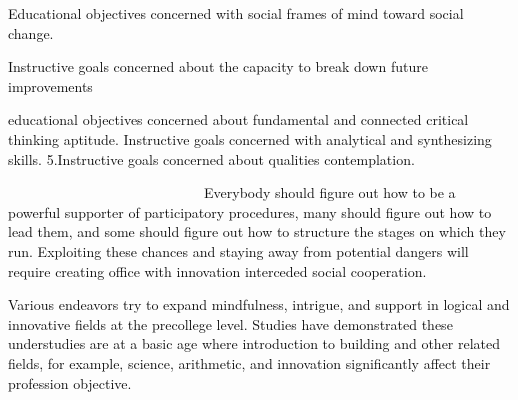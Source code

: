 \documentclass[12pt]{report}
\renewcommand{\_}{\kern-1.5pt\textunderscore\kern-1.5pt}
\begin{document}
\vspace{\baselineskip}
	\item \textcolor[HTML]{0D0D0D}{Educational objectives concerned with social frames of mind toward social  change.}\par


\vspace{\baselineskip}
	\item \textcolor[HTML]{0D0D0D}{Instructive goals concerned about the capacity to break down future improvements}\par


\vspace{\baselineskip}
	\item \textcolor[HTML]{0D0D0D}{educational objectives concerned about fundamental and connected critical thinking aptitude. Instructive goals concerned with analytical and synthesizing skills. 5.Instructive goals concerned about qualities contemplation. }\par


\vspace{\baselineskip}

\vspace{\baselineskip}
\begin{adjustwidth}{0.1in}{0.84in}
\textcolor[HTML]{0D0D0D}{\ \ \ \ \ \ \ \ \ \ \ \ \ \ \ \ \ \ \ \ \ \ \ \ \ \ \ \  Everybody should figure out how to be a powerful supporter of participatory procedures, many should figure out how to lead them, and some should figure out how to structure the stages on which they run. Exploiting these chances and staying away from potential dangers will require creating office with innovation interceded social cooperation.}\par

\end{adjustwidth}


\vspace{\baselineskip}
\vspace{\baselineskip}
\vspace{\baselineskip}
\vspace{\baselineskip}
\vspace{\baselineskip}
\vspace{\baselineskip}\begin{adjustwidth}{0.2in}{0.84in}
\textcolor[HTML]{0D0D0D}{Various endeavors try to expand mindfulness, intrigue, and support in logical and innovative fields at the precollege level. Studies have demonstrated these understudies are at a basic age where introduction to building and other related fields, for example, science, arithmetic, and innovation significantly affect their profession  objective.}\par

\end{adjustwidth}
\end{document}

